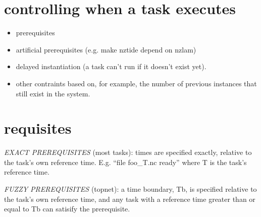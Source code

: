 \documentclass[11pt,a4paper]{report}
\begin{document}
\section{controlling when a task executes}

\begin{itemize}
 \item  prerequisites
 \item artificial prerequisites (e.g. make nztide depend on nzlam)
 \item delayed instantiation (a task can't run if it doesn't exist yet).
 \item other contraints based on, for example, the number of previous
 instances that still exist in the system.
\end{itemize}


\section{requisites}

{\em EXACT PREREQUISITES} (most tasks): times are specified exactly,
relative to the task's own reference time.  E.g. ``file foo\_{T}.nc
ready'' where T is the task's reference time.

{\em FUZZY PREREQUISITES} (topnet): a time boundary, Tb, is specified
relative to the task's own reference time, and any task with a reference
time greater than or equal to Tb can satisify the prerequisite.
\end{document}
